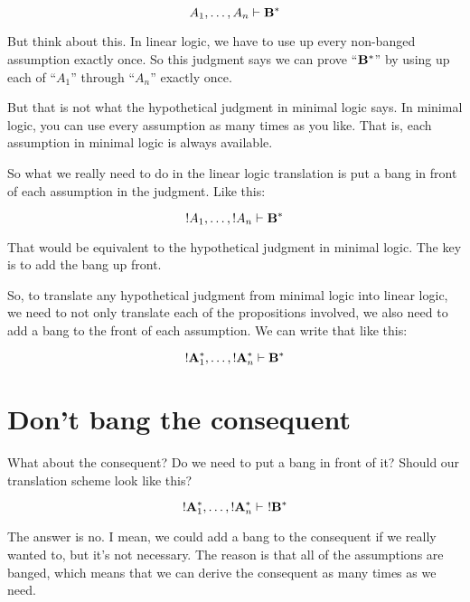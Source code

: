 \documentclass[../../../main.tex]{subfiles}
\begin{document}
\begin{equation*}
  A_{1}, \ldots, A_{n} \ndturnstile/ \nd{B}^{*}
\end{equation*}

\noindent
But think about this. In linear logic, we have to use up every non-banged assumption exactly once. So this judgment says we can prove ``$\mathbf{B}^{*}$'' by using up each of ``$A_{1}$'' through ``$A_{n}$'' exactly once.

But that is not what the hypothetical judgment in minimal logic says. In minimal logic, you can use every assumption as many times as you like. That is, each assumption in minimal logic is always available.

So what we really need to do in the linear logic translation is put a bang in front of each assumption in the judgment. Like this:

\begin{equation*}
  \bang/A_{1}, \ldots, \bang/A_{n} \ndturnstile/ \nd{B}^{*}
\end{equation*}

\noindent
That would be equivalent to the hypothetical judgment in minimal logic. The key is to add the bang up front.

So, to translate any hypothetical judgment from minimal logic into linear logic, we need to not only translate each of the propositions involved, we also need to add a bang to the front of each assumption. We can write that like this:

\begin{equation*}
  \bang/\nd{A}_{1}^{*}, \ldots, \bang/\nd{A}_{n}^{*} \ndturnstile/ \nd{B}^{*}
\end{equation*}


\section{Don't bang the consequent}

What about the consequent? Do we need to put a bang in front of it? Should our translation scheme look like this?

\begin{equation*}
  \bang/\nd{A}_{1}^{*}, \ldots, \bang/\nd{A}_{n}^{*} \ndturnstile/~\bang/\nd{B}^{*}
\end{equation*}

\noindent
The answer is no. I mean, we could add a bang to the consequent if we really wanted to, but it's not necessary. The reason is that all of the assumptions are banged, which means that we can derive the consequent as many times as we need. 
\end{document}
